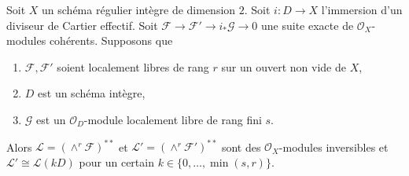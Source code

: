 \begin{lemma}
\label{lemma-wedge-product-ses}
Soit  $X$  un schéma régulier intègre de dimension  $2$. Soit
 $i : D \to X$  l'immersion d'un diviseur de Cartier effectif. Soit  $\mathcal{F} \to \mathcal{F}' \to i_*\mathcal{G} \to 0$  une
suite exacte de  $\mathcal{O}_X$-modules cohérents. Supposons que
\begin{enumerate}
\item $\mathcal{F}, \mathcal{F}'$  soient localement libres de rang  $r$  sur un ouvert non vide
de  $X$,
\item $D$  est un schéma intègre,
\item $\mathcal{G}$  est un  $\mathcal{O}_D$-module localement libre de rang fini
 $s$.
\end{enumerate}
Alors  $\mathcal{L} = (\wedge^r\mathcal{F})^{**}$  et  $\mathcal{L}' = (\wedge^r \mathcal{F}')^{**}$  sont des  $\mathcal{O}_X$-modules inversibles et
 $\mathcal{L}' \cong \mathcal{L}(k D)$  pour un certain  $k \in \{0, \ldots, \min(s, r)\}$.
\end{lemma}

